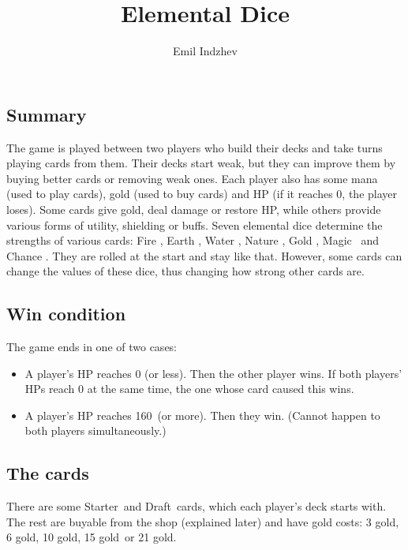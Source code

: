 \documentclass[dvipsnames,parskip,a4paper]{scrartcl}
\date{}
\title{Elemental Dice}
\author{Emil Indzhev}
\newcommand{\iconsize}{3.4mm}
\newcommand{\icondepth}{0.45mm}
\newcommand{\icon}[1]{\raisebox{-\icondepth}{\texttt{[image:  \#1 ]}}}
\newcommand{\fire}{\icon{icons/fire.png}}
\newcommand{\earth}{\icon{icons/earth.png}}
\newcommand{\water}{\icon{icons/water.png}}
\newcommand{\nature}{\icon{icons/nature.png}}
\newcommand{\magic}{\icon{icons/magic.png}}
\newcommand{\gold}{\icon{icons/gold.png}}
\newcommand{\chance}{\icon{icons/chance.png}}
\newcommand{\starter}{Starter}
\newcommand{\draft}{Draft}
\newcommand{\onecost}{3 gold}
\newcommand{\twocost}{6 gold}
\newcommand{\threecost}{10 gold}
\newcommand{\fourcost}{15 gold}
\newcommand{\fivecost}{21 gold}
\newcommand{\maxhp}{160}
\begin{document}
\maketitle

\newpage

\subsection*{Summary}

The game is played between two players who build their decks and take turns playing cards from them. Their decks start weak, but they can improve them by buying better cards or removing weak ones. Each player also has some mana (used to play cards), gold (used to buy cards) and HP (if it reaches 0, the player loses). Some cards give gold, deal damage or restore HP, while others provide various forms of utility, shielding or buffs. Seven elemental dice determine the strengths of various cards: Fire \fire, Earth \earth, Water \water, Nature \nature, Gold \gold, Magic \magic \ and Chance \chance. They are rolled at the start and stay like that. However, some cards can change the values of these dice, thus changing how strong other cards are.

\subsection*{Win condition}

The game ends in one of two cases:

\begin{itemize}
\item A player's HP reaches 0 (or less). Then the other player wins. If both players' HPs reach 0 at the same time, the one whose card caused this wins.
\item A player's HP reaches \maxhp \ (or more). Then they win. (Cannot happen to both players simultaneously.)
\end{itemize}

\subsection*{The cards}

There are some \starter \ and \draft \ cards, which each player's deck starts with. The rest are buyable from the shop (explained later) and have gold costs: \onecost, \twocost, \threecost, \fourcost \ or \fivecost.

\vspace{4pt}
\end{document}
